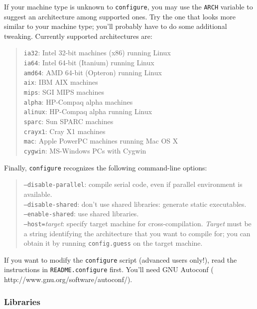 \documentclass[12pt,a4paper]{article}
\begin{document}
If your machine type is unknown to \texttt{configure}, you may use the
\texttt{ARCH} variable to suggest an architecture among supported
ones.  Try the one that looks more similar to your machine type;
you'll probably have to do some additional tweaking.
Currently supported architectures are:
\begin{quote}
  \texttt{ia32}:    Intel 32-bit machines (x86) running Linux\\
  \texttt{ia64}:    Intel 64-bit (Itanium) running Linux\\
  \texttt{amd64}:   AMD 64-bit (Opteron) running Linux\\
  \texttt{aix}:     IBM AIX machines\\
  \texttt{mips}:    SGI MIPS machines\\
  \texttt{alpha}:   HP-Compaq alpha machines\\
  \texttt{alinux}:  HP-Compaq alpha running Linux\\
  \texttt{sparc}:   Sun SPARC machines\\
  \texttt{crayx1}:  Cray X1 machines\\
  \texttt{mac}:     Apple PowerPC machines running Mac OS X\\
  \texttt{cygwin}:  MS-Windows PCs with Cygwin
\end{quote}
Finally, \texttt{configure} recognizes the following command-line
options:
\begin{quote}
  \texttt{--disable-parallel}:
    compile serial code, even if parallel environment is available.\\
  \texttt{--disable-shared}:
    don't use shared libraries: generate static executables.\\
  \texttt{--enable-shared}:
    use shared libraries.\\
  \texttt{--host=}\emph{target}:
    specify target machine for cross-compilation.\break
    \emph{Target} must be a string identifying the architecture that
    you want to compile for; you can obtain it by running
    \texttt{config.guess} on the target machine.
\end{quote}
If you want to modify the \texttt{configure} script (advanced users
only!), read the instructions in \texttt{README.configure} first.
You'll need GNU Autoconf
(%
                   {http://www.gnu.org/software/autoconf/}).

\subsubsection{Libraries}
  \label{libraries}
\end{document}
